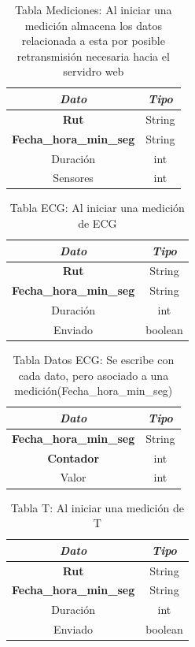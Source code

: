 \begin{table}[H]
	\centering
	\begin{tabular}{| c | c |}
		\hline
		\multicolumn{1}{|c|}{\textit{Dato}}&
		\multicolumn{1}{c|}{\textit{Tipo}}\\ \hline
		\textbf{Rut}  & String   \\ \hline
		\textbf{Fecha\_hora\_min\_seg}  & String  \\ \hline
		Duración & int  \\ \hline
		Sensores & int  \\ \hline
	\end{tabular}
	\caption{Tabla Mediciones: Al iniciar una medición almacena los datos relacionada a esta por posible retransmisión necesaria hacia el servidro web}
	\label{tabla_mediciones}
\end{table}

\begin{table}[H]
	\centering
	\begin{tabular}{| c | c |}
		\hline
		\multicolumn{1}{|c|}{\textit{Dato}}&
		\multicolumn{1}{c|}{\textit{Tipo}}\\ \hline
		\textbf{Rut}  & String   \\ \hline
		\textbf{Fecha\_hora\_min\_seg}  & String  \\ \hline
		Duración & int  \\ \hline
		Enviado & boolean  \\ \hline
	\end{tabular}
	\caption{Tabla ECG: Al iniciar una medición de ECG}
	\label{tabla_ECG}
\end{table}

\begin{table}[H]
	\centering
	\begin{tabular}{| c | c |}
		\hline
		\multicolumn{1}{|c|}{\textit{Dato}}&
		\multicolumn{1}{c|}{\textit{Tipo}}\\ \hline
		\textbf{Fecha\_hora\_min\_seg}  & String  \\ \hline
		\textbf{Contador}  & int  \\ \hline
		Valor & int  \\ \hline
	\end{tabular}
	\caption{Tabla Datos ECG: Se escribe con cada dato, pero asociado a una medición(Fecha\_hora\_min\_seg)}
	\label{tabla_datos_ECG}
\end{table}

\begin{table}[H]
	\centering
	\begin{tabular}{| c | c |}
		\hline
		\multicolumn{1}{|c|}{\textit{Dato}}&
		\multicolumn{1}{c|}{\textit{Tipo}}\\ \hline
		\textbf{Rut}  & String   \\ \hline
		\textbf{Fecha\_hora\_min\_seg}  & String  \\ \hline
		Duración & int  \\ \hline
		Enviado & boolean  \\ \hline
	\end{tabular}
	\caption{Tabla T: Al iniciar una medición de T}
	\label{tabla_T}
\end{table}

